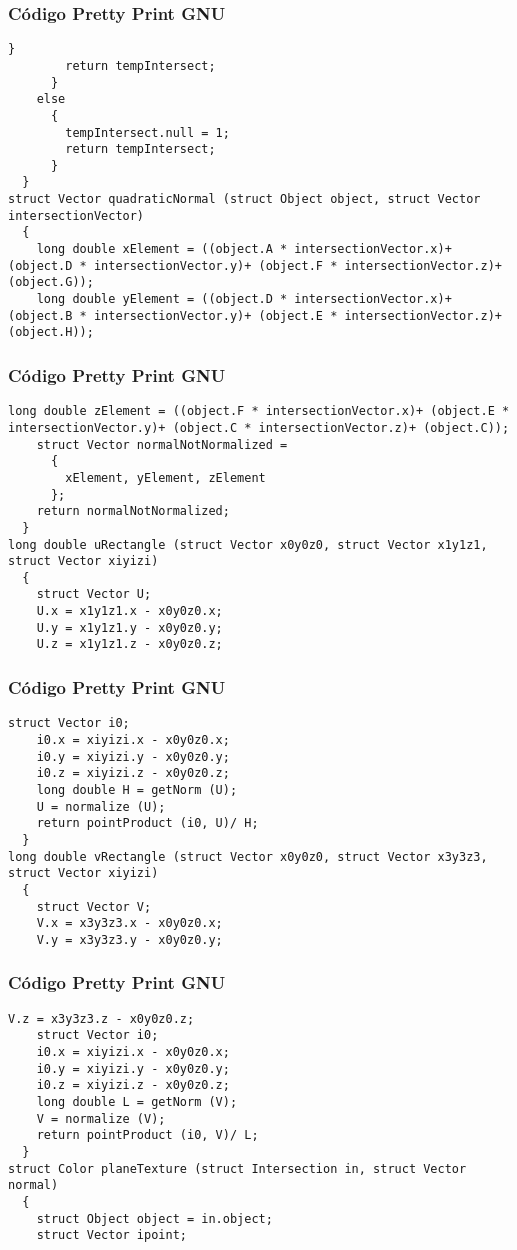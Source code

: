 \documentclass{beamer}
\begin{document}
\begin{frame}[fragile]
\frametitle{C\'odigo Pretty Print GNU}
\begin{lstlisting}[style=CStyle]
          }
        return tempIntersect;
      }
    else
      {
        tempIntersect.null = 1;
        return tempIntersect;
      }
  }
struct Vector quadraticNormal (struct Object object, struct Vector intersectionVector)
  {
    long double xElement = ((object.A * intersectionVector.x)+ (object.D * intersectionVector.y)+ (object.F * intersectionVector.z)+ (object.G));
    long double yElement = ((object.D * intersectionVector.x)+ (object.B * intersectionVector.y)+ (object.E * intersectionVector.z)+ (object.H));
\end{lstlisting}
\end{frame}
\begin{frame}[fragile]
\frametitle{C\'odigo Pretty Print GNU}
\begin{lstlisting}[style=CStyle]
    long double zElement = ((object.F * intersectionVector.x)+ (object.E * intersectionVector.y)+ (object.C * intersectionVector.z)+ (object.C));
    struct Vector normalNotNormalized =
      {
        xElement, yElement, zElement
      };
    return normalNotNormalized;
  }
long double uRectangle (struct Vector x0y0z0, struct Vector x1y1z1, struct Vector xiyizi)
  {
    struct Vector U;
    U.x = x1y1z1.x - x0y0z0.x;
    U.y = x1y1z1.y - x0y0z0.y;
    U.z = x1y1z1.z - x0y0z0.z;
\end{lstlisting}
\end{frame}
\begin{frame}[fragile]
\frametitle{C\'odigo Pretty Print GNU}
\begin{lstlisting}[style=CStyle]
    struct Vector i0;
    i0.x = xiyizi.x - x0y0z0.x;
    i0.y = xiyizi.y - x0y0z0.y;
    i0.z = xiyizi.z - x0y0z0.z;
    long double H = getNorm (U);
    U = normalize (U);
    return pointProduct (i0, U)/ H;
  }
long double vRectangle (struct Vector x0y0z0, struct Vector x3y3z3, struct Vector xiyizi)
  {
    struct Vector V;
    V.x = x3y3z3.x - x0y0z0.x;
    V.y = x3y3z3.y - x0y0z0.y;
\end{lstlisting}
\end{frame}
\begin{frame}[fragile]
\frametitle{C\'odigo Pretty Print GNU}
\begin{lstlisting}[style=CStyle]
    V.z = x3y3z3.z - x0y0z0.z;
    struct Vector i0;
    i0.x = xiyizi.x - x0y0z0.x;
    i0.y = xiyizi.y - x0y0z0.y;
    i0.z = xiyizi.z - x0y0z0.z;
    long double L = getNorm (V);
    V = normalize (V);
    return pointProduct (i0, V)/ L;
  }
struct Color planeTexture (struct Intersection in, struct Vector normal)
  {
    struct Object object = in.object;
    struct Vector ipoint;
\end{lstlisting}
\end{frame}
\end{document}
